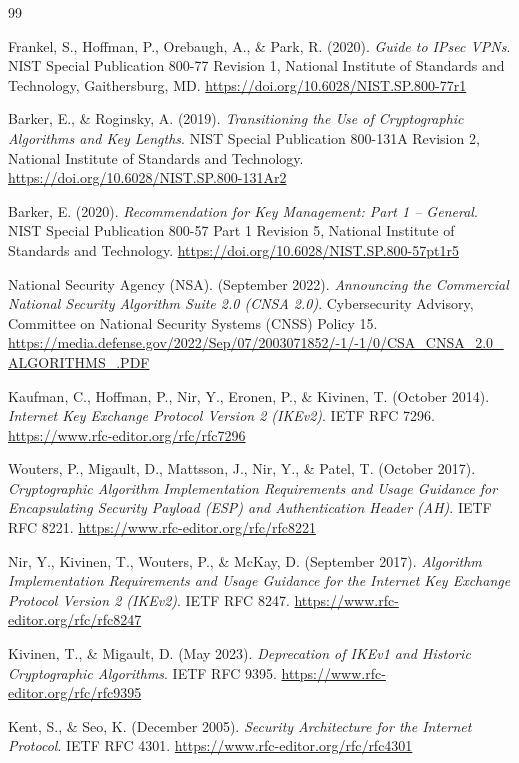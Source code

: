 \documentclass[11pt,a4paper]{article}
\begin{document}
\begin{thebibliography}{99}

Frankel, S., Hoffman, P., Orebaugh, A., \& Park, R. (2020).
\textit{Guide to IPsec VPNs}.
NIST Special Publication 800-77 Revision 1, National Institute of Standards and Technology, Gaithersburg, MD.
\url{https://doi.org/10.6028/NIST.SP.800-77r1}

Barker, E., \& Roginsky, A. (2019).
\textit{Transitioning the Use of Cryptographic Algorithms and Key Lengths}.
NIST Special Publication 800-131A Revision 2, National Institute of Standards and Technology.
\url{https://doi.org/10.6028/NIST.SP.800-131Ar2}

Barker, E. (2020).
\textit{Recommendation for Key Management: Part 1 -- General}.
NIST Special Publication 800-57 Part 1 Revision 5, National Institute of Standards and Technology.
\url{https://doi.org/10.6028/NIST.SP.800-57pt1r5}

National Security Agency (NSA). (September 2022).
\textit{Announcing the Commercial National Security Algorithm Suite 2.0 (CNSA 2.0)}.
Cybersecurity Advisory, Committee on National Security Systems (CNSS) Policy 15.
\url{https://media.defense.gov/2022/Sep/07/2003071852/-1/-1/0/CSA_CNSA_2.0_ALGORITHMS_.PDF}

Kaufman, C., Hoffman, P., Nir, Y., Eronen, P., \& Kivinen, T. (October 2014).
\textit{Internet Key Exchange Protocol Version 2 (IKEv2)}.
IETF RFC 7296.
\url{https://www.rfc-editor.org/rfc/rfc7296}

Wouters, P., Migault, D., Mattsson, J., Nir, Y., \& Patel, T. (October 2017).
\textit{Cryptographic Algorithm Implementation Requirements and Usage Guidance for Encapsulating Security Payload (ESP) and Authentication Header (AH)}.
IETF RFC 8221.
\url{https://www.rfc-editor.org/rfc/rfc8221}

Nir, Y., Kivinen, T., Wouters, P., \& McKay, D. (September 2017).
\textit{Algorithm Implementation Requirements and Usage Guidance for the Internet Key Exchange Protocol Version 2 (IKEv2)}.
IETF RFC 8247.
\url{https://www.rfc-editor.org/rfc/rfc8247}

Kivinen, T., \& Migault, D. (May 2023).
\textit{Deprecation of IKEv1 and Historic Cryptographic Algorithms}.
IETF RFC 9395.
\url{https://www.rfc-editor.org/rfc/rfc9395}

Kent, S., \& Seo, K. (December 2005).
\textit{Security Architecture for the Internet Protocol}.
IETF RFC 4301.
\url{https://www.rfc-editor.org/rfc/rfc4301}


\end{thebibliography}
\end{document}
